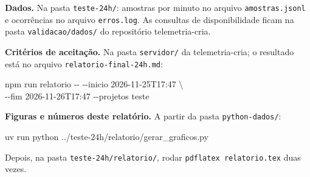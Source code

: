 \documentclass[11pt,a4paper]{article}
\begin{document}
{\raggedright
\textbf{Dados.} Na pasta \texttt{teste-24h/}: amostras por minuto no arquivo \texttt{amostras.jsonl} e ocorrências no arquivo \texttt{erros.log}. As consultas de disponibilidade ficam na pasta \texttt{validacao/dados/} do repositório telemetria-cria.

\textbf{Critérios de aceitação.} Na pasta \texttt{servidor/} da telemetria-cria; o resultado está no arquivo \texttt{relatorio-final-24h.md}:

{\footnotesize\ttfamily npm run relatorio -{}- -{}-inicio 2026-11-25T17:47 \textbackslash\\
\hspace*{2em}-{}-fim 2026-11-26T17:47 -{}-projetos teste\par}

\textbf{Figuras e números deste relatório.} A partir da pasta \texttt{python-dados/}:

{\footnotesize\ttfamily uv run python ../teste-24h/relatorio/gerar\_graficos.py\par}

Depois, na pasta \texttt{teste-24h/relatorio/}, rodar \texttt{pdflatex relatorio.tex} duas vezes.\par}
\end{document}
